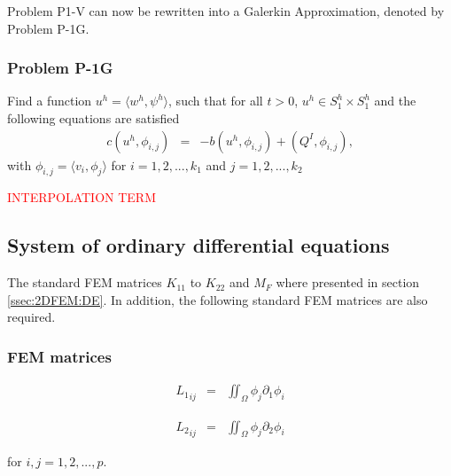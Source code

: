 \documentclass[../../main.tex]{subfiles}
\begin{document}
Problem P1-V can now be rewritten into a Galerkin Approximation, denoted by Problem P-1G.

\subsubsection{Problem P-1G}
Find a function $u^h = \langle w^h, \psi^h \rangle$, such that for all $t>0$, $u^h \in S_1^h \times S_1^h$ and the following equations are satisfied
\begin{eqnarray}
	c(u^h,\phi_{i,j}) &=& -b(u^h,\phi_{i,j}) + (Q^I,\phi_{i,j}), \label{eq:P_Model:ProblemP1V1}
\end{eqnarray} with $\phi_{i,j} = \langle v_i, \phi_j \rangle$ for $i = 1,2,...,k_1$ and $j = 1,2,...,k_2$

\textcolor{red}{INTERPOLATION TERM}

\subsection{System of ordinary differential equations}
The standard FEM matrices $K_{11}$ to $K_{22}$ and $M_F$ where presented in section \ref{ssec:2DFEM:DE}. In addition, the following standard FEM matrices are also required.

\subsubsection{FEM matrices}
\noindent\begin{minipage}{.5\linewidth}
	\begin{eqnarray*}
		{L_{1}}_{ij} & = & \iint_{\Omega} \phi_j \partial_1\phi_i
	\end{eqnarray*}
\end{minipage}%
\begin{minipage}{.5\linewidth}
	\begin{eqnarray*}
		{L_{2}}_{ij} & = & \iint_{\Omega} \phi_j \partial_2\phi_i
	\end{eqnarray*}
\end{minipage}

for $i,j = 1,2,...,p$.\\
\end{document}
